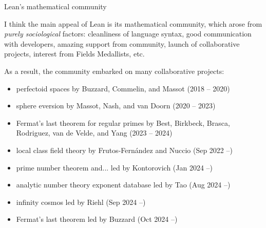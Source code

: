 \documentclass[10pt]{beamer}
\begin{document}
\begin{frame}[t]{Lean's mathematical community}

I think the main appeal of Lean is its mathematical community, which arose from \emph{purely sociological} factors: cleanliness of language syntax, good communication with developers, amazing support from community, launch of collaborative projects, interest from Fields Medallists, etc.

\pause

\vspace{0.5cm} As a result, the community embarked on many collaborative projects:
\begin{itemize}
\item perfectoid spaces by Buzzard, Commelin, and Massot (2018 -- 2020)
\item sphere eversion by Massot, Nash, and van Doorn (2020 -- 2023)
\item Fermat's last theorem for regular primes by Best, Birkbeck, Brasca, Rodriguez, van de Velde, and Yang (2023 -- 2024)

\pause

\item local class field theory by Frutos-Fern\'andez and Nuccio (Sep 2022 --)
\item prime number theorem and... led by Kontorovich (Jan 2024 --)
\item analytic number theory exponent database led by Tao (Aug 2024 --)
\item infinity cosmos led by Riehl (Sep 2024 --)
\item Fermat's last theorem led by Buzzard (Oct 2024 --)
\end{itemize}

\end{frame}
\end{document}
